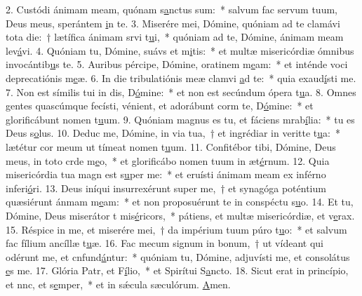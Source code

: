 2. Custódi ánimam meam, quónam s\uline{a}nctus sum:~* salvum fac servum tuum, Deus meus, sperántem \uline{i}n te.
3. Miserére mei, Dómine, quóniam ad te clamávi tota die:~† lætífica ánimam srvi t\uline{u}i,~* quóniam ad te, Dómine, ánimam meam lev\uline{á}vi.
4. Quóniam tu, Dómine, suávs et m\uline{i}tis:~* et multæ misericórdiæ ómnibus invocántib\uline{u}s te.
5. Auribus pércipe, Dómine, oratinem m\uline{e}am:~* et inténde voci deprecatiónis m\uline{e}æ.
6. In die tribulatiónis meæ clamvi \uline{a}d te:~* quia exaud\uline{í}sti me.
7. Non est símilis tui in dis, D\uline{ó}mine:~* et non est secúndum ópera t\uline{u}a.
8. Omnes gentes quascúmque fecísti, vénient, et adorábunt corm te, D\uline{ó}mine:~* et glorificábunt nomen t\uline{u}um.
9. Quóniam magnus es tu, et fáciens mrab\uline{í}lia:~* tu es Deus s\uline{o}lus.
10. Deduc me, Dómine, in via tua,~† et ingrédiar in veritte t\uline{u}a:~* lætétur cor meum ut tímeat nomen t\uline{u}um.
11. Confitébor tibi, Dómine, Deus meus, in toto crde m\uline{e}o,~* et glorificábo nomen tuum in æt\uline{é}rnum.
12. Quia misericórdia tua magn est s\uline{u}per me:~* et eruísti ánimam meam ex inférno inferi\uline{ó}ri.
13. Deus iníqui insurrexérunt super me,~† et synagóga poténtium quæsiérunt ánmam m\uline{e}am:~* et non proposuérunt te in conspéctu s\uline{u}o.
14. Et tu, Dómine, Deus miserátor t mis\uline{é}ricors,~* pátiens, et multæ misericórdiæ, et v\uline{e}rax.
15. Réspice in me, et miserére mei,~† da impérium tuum púro t\uline{u}o:~* et salvum fac fílium ancíllæ t\uline{u}æ.
16. Fac mecum signum in bonum,~† ut vídeant qui odérunt me, et cnfund\uline{á}ntur:~* quóniam tu, Dómine, adjuvísti me, et consolátus \uline{e}s me.
17. Glória Patr, et F\uline{í}lio,~* et Spirítui S\uline{a}ncto.
18. Sicut erat in princípio, et nnc, et s\uline{e}mper,~* et in sǽcula sæculórum. \uline{A}men.
